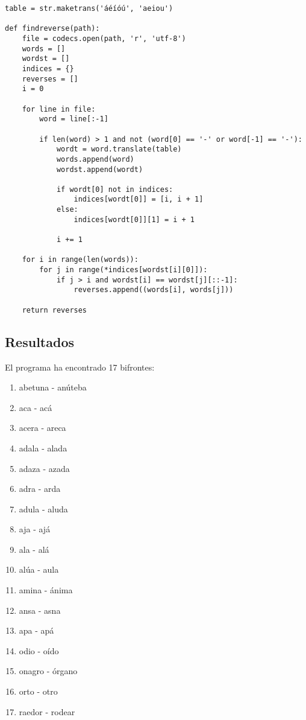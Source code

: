 \documentclass[10pt,a4paper]{article}
\begin{document}
    \begin{Verbatim}
table = str.maketrans('áéíóú', 'aeiou')
    
def findreverse(path):
    file = codecs.open(path, 'r', 'utf-8')
    words = []
    wordst = []
    indices = {}
    reverses = []
    i = 0
   
    for line in file:
        word = line[:-1]
    
        if len(word) > 1 and not (word[0] == '-' or word[-1] == '-'):
            wordt = word.translate(table)
            words.append(word)
            wordst.append(wordt)
   
            if wordt[0] not in indices:
                indices[wordt[0]] = [i, i + 1]
            else:
                indices[wordt[0]][1] = i + 1
    
            i += 1
    
    for i in range(len(words)):
        for j in range(*indices[wordst[i][0]]):
            if j > i and wordst[i] == wordst[j][::-1]:
                reverses.append((words[i], words[j]))
    
    return reverses
    \end{Verbatim}
    
    \subsection{Resultados}
    
    El programa ha encontrado 17 bifrontes:
    
    \begin{multicols}{2}
    	\begin{enumerate}
    		\item abetuna - anúteba
    		\item aca - acá
    		\item acera - areca
    		\item adala - alada
    		\item adaza - azada
    		\item adra - arda
    		\item adula - aluda
    		\item aja - ajá
    		\item ala - alá
    		\item alúa - aula
    		\item amina - ánima
    		\item ansa - asna
    		\item apa - apá
    		\item odio - oído
    		\item onagro - órgano
    		\item orto - otro
    		\item raedor - rodear
    	\end{enumerate}
    \end{multicols}
\end{document}
